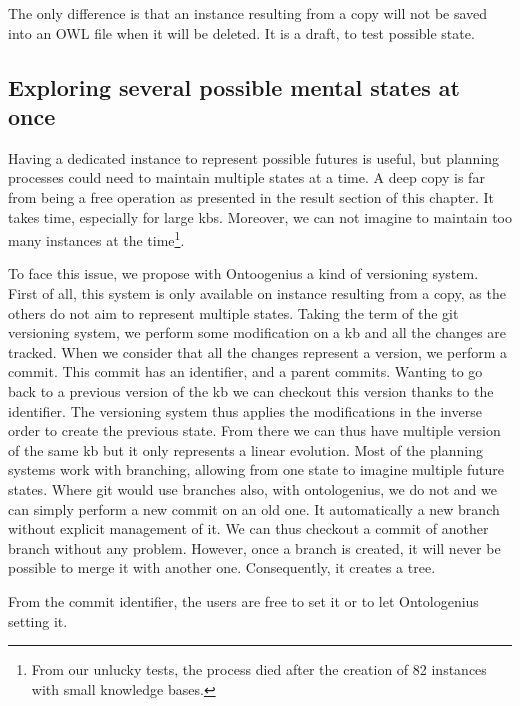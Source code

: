 The only difference is that an instance resulting from a copy will not be saved into an OWL file when it will be deleted. It is a draft, to test possible state.

\subsection{Exploring several possible mental states at once}

Having a dedicated instance to represent possible futures is useful, but planning processes could need to maintain multiple states at a time. A deep copy is far from being a free operation as presented in the result section of this chapter. It takes time, especially for large \acrshort{kb}s. Moreover, we can not imagine to maintain too many instances at the time\footnote{From our unlucky tests, the process died after the creation of 82 instances with small knowledge bases.}.

To face this issue, we propose with Ontoogenius a kind of versioning system. First of all, this system is only available on instance resulting from a copy, as the others do not aim to represent multiple states. Taking the term of the git versioning system, we perform some modification on a \acrshort{kb} and all the changes are tracked. When we consider that all the changes represent a version, we perform a commit. This commit has an identifier, and a parent commits. Wanting to go back to a previous version of the \acrshort{kb} we can checkout this version thanks to the identifier. The versioning system thus applies the modifications in the inverse order to create the previous state. From there we can thus have multiple version of the same \acrshort{kb} but it only represents a linear evolution. Most of the planning systems work with branching, allowing from one state to imagine multiple future states. Where git would use branches also, with ontologenius, we do not and we can simply perform a new commit on an old one. It automatically a new branch without explicit management of it. We can thus checkout a commit of another branch without any problem. However, once a branch is created, it will never be possible to merge it with another one. Consequently, it creates a tree.

From the commit identifier, the users are free to set it or to let Ontologenius setting it.

